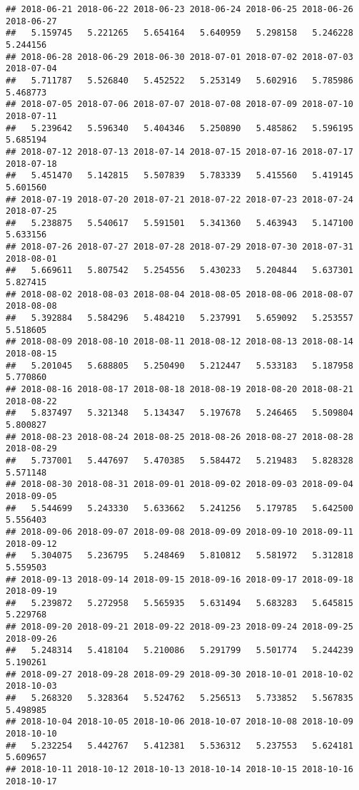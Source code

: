 \documentclass[
]{article}
\begin{document}
\begin{verbatim}
## 2018-06-21 2018-06-22 2018-06-23 2018-06-24 2018-06-25 2018-06-26 2018-06-27 
##   5.159745   5.221265   5.654164   5.640959   5.298158   5.246228   5.244156 
## 2018-06-28 2018-06-29 2018-06-30 2018-07-01 2018-07-02 2018-07-03 2018-07-04 
##   5.711787   5.526840   5.452522   5.253149   5.602916   5.785986   5.468773 
## 2018-07-05 2018-07-06 2018-07-07 2018-07-08 2018-07-09 2018-07-10 2018-07-11 
##   5.239642   5.596340   5.404346   5.250890   5.485862   5.596195   5.685194 
## 2018-07-12 2018-07-13 2018-07-14 2018-07-15 2018-07-16 2018-07-17 2018-07-18 
##   5.451470   5.142815   5.507839   5.783339   5.415560   5.419145   5.601560 
## 2018-07-19 2018-07-20 2018-07-21 2018-07-22 2018-07-23 2018-07-24 2018-07-25 
##   5.238875   5.540617   5.591501   5.341360   5.463943   5.147100   5.633156 
## 2018-07-26 2018-07-27 2018-07-28 2018-07-29 2018-07-30 2018-07-31 2018-08-01 
##   5.669611   5.807542   5.254556   5.430233   5.204844   5.637301   5.827415 
## 2018-08-02 2018-08-03 2018-08-04 2018-08-05 2018-08-06 2018-08-07 2018-08-08 
##   5.392884   5.584296   5.484210   5.237991   5.659092   5.253557   5.518605 
## 2018-08-09 2018-08-10 2018-08-11 2018-08-12 2018-08-13 2018-08-14 2018-08-15 
##   5.201045   5.688805   5.250490   5.212447   5.533183   5.187958   5.770860 
## 2018-08-16 2018-08-17 2018-08-18 2018-08-19 2018-08-20 2018-08-21 2018-08-22 
##   5.837497   5.321348   5.134347   5.197678   5.246465   5.509804   5.800827 
## 2018-08-23 2018-08-24 2018-08-25 2018-08-26 2018-08-27 2018-08-28 2018-08-29 
##   5.737001   5.447697   5.470385   5.584472   5.219483   5.828328   5.571148 
## 2018-08-30 2018-08-31 2018-09-01 2018-09-02 2018-09-03 2018-09-04 2018-09-05 
##   5.544699   5.243330   5.633662   5.241256   5.179785   5.642500   5.556403 
## 2018-09-06 2018-09-07 2018-09-08 2018-09-09 2018-09-10 2018-09-11 2018-09-12 
##   5.304075   5.236795   5.248469   5.810812   5.581972   5.312818   5.559503 
## 2018-09-13 2018-09-14 2018-09-15 2018-09-16 2018-09-17 2018-09-18 2018-09-19 
##   5.239872   5.272958   5.565935   5.631494   5.683283   5.645815   5.229768 
## 2018-09-20 2018-09-21 2018-09-22 2018-09-23 2018-09-24 2018-09-25 2018-09-26 
##   5.248314   5.418104   5.210086   5.291799   5.501774   5.244239   5.190261 
## 2018-09-27 2018-09-28 2018-09-29 2018-09-30 2018-10-01 2018-10-02 2018-10-03 
##   5.268320   5.328364   5.524762   5.256513   5.733852   5.567835   5.498985 
## 2018-10-04 2018-10-05 2018-10-06 2018-10-07 2018-10-08 2018-10-09 2018-10-10 
##   5.232254   5.442767   5.412381   5.536312   5.237553   5.624181   5.609657 
## 2018-10-11 2018-10-12 2018-10-13 2018-10-14 2018-10-15 2018-10-16 2018-10-17 

\end{verbatim}
\end{document}

